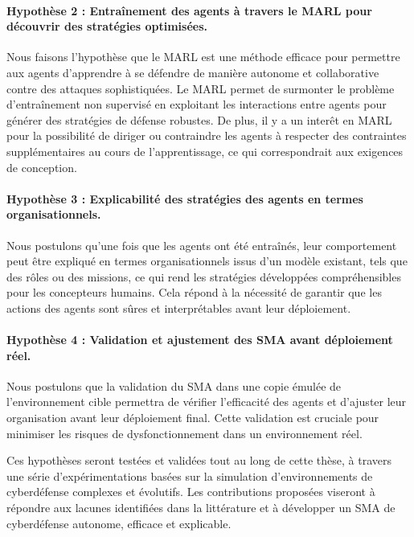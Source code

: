 \paragraph{Hypothèse 2 : Entraînement des agents à travers le MARL pour découvrir des stratégies optimisées.}
Nous faisons l'hypothèse que le MARL est une méthode efficace pour permettre aux agents d’apprendre à se défendre de manière autonome et collaborative contre des attaques sophistiquées. Le MARL permet de surmonter le problème d’entraînement non supervisé en exploitant les interactions entre agents pour générer des stratégies de défense robustes. De plus, il y a un interêt en MARL pour la possibilité de diriger ou contraindre les agents à respecter des contraintes supplémentaires au cours de l'apprentissage, ce qui correspondrait aux exigences de conception.

\paragraph{Hypothèse 3 : Explicabilité des stratégies des agents en termes organisationnels.}
Nous postulons qu'une fois que les agents ont été entraînés, leur comportement peut être expliqué en termes organisationnels issus d'un modèle existant, tels que des rôles ou des missions, ce qui rend les stratégies développées compréhensibles pour les concepteurs humains. Cela répond à la nécessité de garantir que les actions des agents sont sûres et interprétables avant leur déploiement.

\paragraph{Hypothèse 4 : Validation et ajustement des SMA avant déploiement réel.}
Nous postulons que la validation du SMA dans une copie émulée de l’environnement cible permettra de vérifier l'efficacité des agents et d'ajuster leur organisation avant leur déploiement final. Cette validation est cruciale pour minimiser les risques de dysfonctionnement dans un environnement réel.

Ces hypothèses seront testées et validées tout au long de cette thèse, à travers une série d’expérimentations basées sur la simulation d’environnements de cyberdéfense complexes et évolutifs. Les contributions proposées viseront à répondre aux lacunes identifiées dans la littérature et à développer un SMA de cyberdéfense autonome, efficace et explicable.
